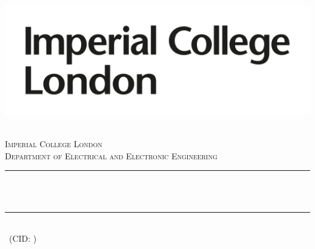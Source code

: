 \begin{titlepage}

\newcommand{\HRule}{\rule{\linewidth}{0.5mm}} %



\includegraphics[width = 0.3\hsize]{./src/logo/imperial}%

\begin{center} %

\textsc{\LARGE \reporttype}\\[1.5cm]
\textsc{\Large Imperial College London}\\[0.5cm]
\textsc{\large Department of Electrical and Electronic Engineering}\\[0.5cm]

\HRule \\[0.4cm]
{ \huge \bfseries \reporttitle}\\ %
\HRule \\[1.5cm]

\large
\reportauthor~(CID: \cid)\\ %
\email

\vspace{2cm}
\makeatletter
\@date
\end{center}

\vfill %



\makeatother


\end{titlepage}

